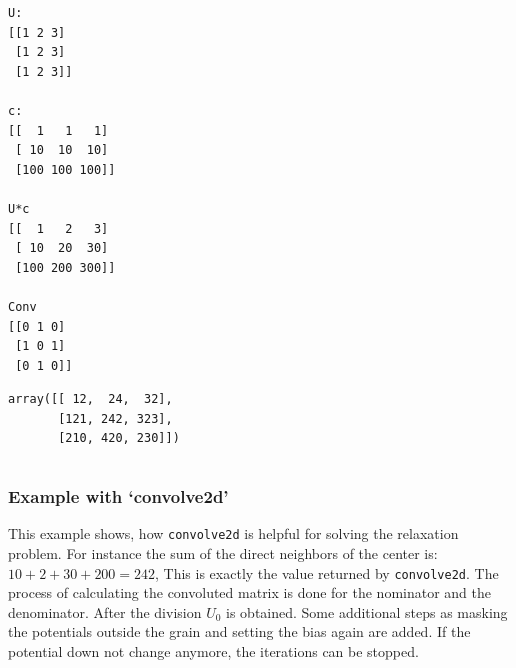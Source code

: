 \documentclass[11pt]{article}
\makeatletter
\newcommand{\boxspacing}{\kern\kvtcb@left@rule\kern\kvtcb@boxsep}
\newcommand{\prompt}[4]{
        \ttfamily\llap{{\color{#2}[#3]:\hspace{3pt}#4}}\vspace{-\baselineskip}
    }
\makeatother
\begin{document}
    \begin{Verbatim}[commandchars=\\\{\}]
U:
[[1 2 3]
 [1 2 3]
 [1 2 3]]

c:
[[  1   1   1]
 [ 10  10  10]
 [100 100 100]]

U*c
[[  1   2   3]
 [ 10  20  30]
 [100 200 300]]

Conv
[[0 1 0]
 [1 0 1]
 [0 1 0]]

    \end{Verbatim}

            \begin{tcolorbox}[breakable, size=fbox, boxrule=.5pt, pad at break*=1mm, opacityfill=0]
\prompt{Out}{outcolor}{61}{\boxspacing}
\begin{Verbatim}[commandchars=\\\{\}]
array([[ 12,  24,  32],
       [121, 242, 323],
       [210, 420, 230]])
\end{Verbatim}
\end{tcolorbox}
        
    \begin{tcolorbox}[breakable, size=fbox, boxrule=1pt, pad at break*=1mm,colback=cellbackground, colframe=cellborder]
\prompt{In}{incolor}{ }{\boxspacing}
\begin{Verbatim}[commandchars=\\\{\}]

\end{Verbatim}
\end{tcolorbox}

    \hypertarget{example-with-convolve2d}{%
\subsubsection{Example with
`convolve2d'}\label{example-with-convolve2d}}

This example shows, how \texttt{convolve2d} is helpful for solving the
relaxation problem. For instance the sum of the direct neighbors of the
center is: \(10+2+30+200=242\), This is exactly the value returned by
\texttt{convolve2d}. The process of calculating the convoluted matrix is
done for the nominator and the denominator. After the division \(U_0\)
is obtained. Some additional steps as masking the potentials outside the
grain and setting the bias again are added. If the potential down not
change anymore, the iterations can be stopped.
\end{document}
